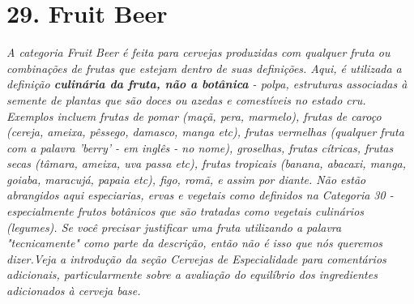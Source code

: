\section*{29. Fruit Beer}
\textit{A categoria Fruit Beer é feita para cervejas produzidas com qualquer fruta ou combinações de frutas que estejam dentro de suas definições. Aqui, é utilizada a definição \textbf{culinária da fruta, não a botânica} - polpa, estruturas associadas à semente de plantas que são doces ou azedas e comestíveis no estado cru. Exemplos incluem frutas de pomar (maçã, pera, marmelo), frutas de caroço (cereja, ameixa, pêssego, damasco, manga etc), frutas vermelhas (qualquer fruta com a palavra 'berry' - em inglês - no nome), groselhas, frutas cítricas, frutas secas (tâmara, ameixa, uva passa etc), frutas tropicais (banana, abacaxi, manga, goiaba, maracujá, papaia etc), figo, romã, e assim por diante. Não estão abrangidos aqui especiarias, ervas e vegetais como definidos na Categoria 30 - especialmente frutos botânicos que são tratadas como vegetais culinários (legumes). Se você precisar justificar uma fruta utilizando a palavra "tecnicamente" como parte da descrição, então não é isso que nós queremos dizer.}\textit{Veja a introdução da seção Cervejas de Especialidade para comentários adicionais, particularmente sobre a avaliação do equilíbrio dos ingredientes adicionados à cerveja base.}
